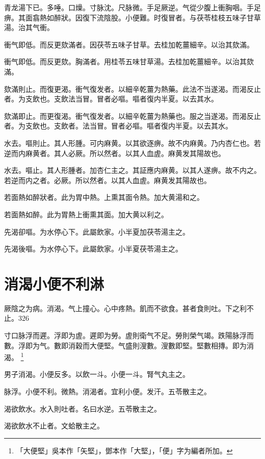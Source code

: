 青龙湯下已。多唾。口燥。寸脉沈。尺脉微。手足厥逆。气從少腹上衝胸咽。手足痹。其面翕熱如醉狀。因復下流陰股。小便難。时復冒者。与茯苓桂枝五味子甘草湯。治其气衝。{\dengben}

衝气即低。而反更欬滿者。因茯苓五味子甘草。去桂加乾薑細辛。以治其欬滿。{\wuben}

衝气即低。而反更欬。胸滿者。用桂苓五味甘草湯。去桂加乾薑細辛。以治其欬滿。{\dengben}

欬滿則止。而復更渴。衝气復发者。以細辛乾薑为熱藥。此法不当遂渴。而渴反止者。为支飲也。支飲法当冒。冒者必嘔。嘔者復内半夏。以去其水。{\wuben}

欬滿即止。而更復渴。衝气復发者。以細辛乾薑为熱藥也。服之当遂渴。而渴反止者。为支飲也。支飲者。法当冒。冒者必嘔。嘔者復内半夏。以去其水。{\dengben}

水去。嘔則止。其人形腫。可内麻黄。以其欲逐痹。故不内麻黄。乃内杏仁也。若逆而内麻黄者。其人必厥。所以然者。以其人血虗。麻黄发其陽故也。{\wuben}

水去。嘔止。其人形腫者。加杏仁主之。其証應内麻黄。以其人遂痹。故不内之。若逆而内之者。必厥。所以然者。以其人血虗。麻黄发其陽故也。{\dengben}

若面熱如醉狀者。此为胃中熱。上熏其面令熱。加大黄湯和之。{\wuben}

若面熱如醉。此为胃熱上衝熏其面。加大黄以利之。{\dengben}

先渴卻嘔。为水停心下。此屬飲家。小半夏加茯苓湯主之。{\wuben}

先渴後嘔。为水停心下。此屬飲家。小半夏茯苓湯主之。{\dengben}

\chapter{消渴小便{\khaaitp 不}利淋}

厥陰之为病。消渴。气上撞{\khaaitp 心}。心中疼熱。飢而不欲食。{\khaaitp 甚者}食則吐。下之利不止。326

寸口脉浮而遲。浮即为虗。遲即为勞。虗則衛气不足。勞則榮气竭。跌陽脉浮而數。浮即为气。數即消穀而大{\khaaitp 便}堅。气盛則溲數。溲數即堅。堅數相摶。即为消渴。
	\footnote{「大便堅」吳本作「矢堅」，鄧本作「大堅」，「便」字为編者所加。}

男子消渴。小便反多。以飲一斗。小便一斗。腎气丸主之。

脉浮。小便不利。微熱。消渴者。宜利小便。发汗。五苓散主之。

渴欲飲水。水入則吐者。名曰水逆。五苓散主之。

渴欲飲水不止者。文蛤散主之。

